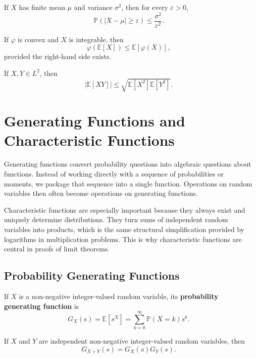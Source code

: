 \begin{theorem}
If $X$ has finite mean $\mu$ and variance $\sigma^2$, then for every $\varepsilon>0$,
\[
    \mathbb{P}(|X-\mu|\geq\varepsilon)\leq\frac{\sigma^2}{\varepsilon^2}.
\]
\end{theorem}

\newpage

\begin{theorem}
If $\varphi$ is convex and $X$ is integrable, then
\[
    \varphi(\mathbb{E}[X])\leq\mathbb{E}[\varphi(X)],
\]
provided the right-hand side exists.
\end{theorem}

\begin{theorem}
If $X,Y\in L^2$, then
\[
    |\mathbb{E}[XY]|\leq \sqrt{\mathbb{E}[X^2]\mathbb{E}[Y^2]}.
\]
\end{theorem}

\section{Generating Functions and Characteristic Functions}


Generating functions convert probability questions into algebraic questions about functions. Instead of working directly with a sequence of probabilities or moments, we package that sequence into a single function. Operations on random variables then often become operations on generating functions.

Characteristic functions are especially important because they always exist and uniquely determine distributions. They turn sums of independent random variables into products, which is the same structural simplification provided by logarithms in multiplication problems. This is why characteristic functions are central in proofs of limit theorems.

\subsection{Probability Generating Functions}

\begin{definition}
If $X$ is a non-negative integer-valued random variable, its \textbf{probability generating function} is
\[
    G_X(s)=\mathbb{E}[s^X]=\sum_{k=0}^{\infty}\mathbb{P}(X=k)s^k.
\]
\end{definition}

\begin{proposition}
If $X$ and $Y$ are independent non-negative integer-valued random variables, then
\[
    G_{X+Y}(s)=G_X(s)G_Y(s).
\]
\end{proposition}

